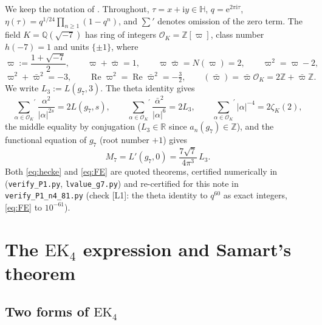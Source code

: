 \documentclass[11pt]{article}
\theoremstyle{definition}
\theoremstyle{remark}
\newcommand{\Hh}{\mathbb{H}}
\newcommand{\Qq}{\mathbb{Q}}
\newcommand{\Zz}{\mathbb{Z}}
\newcommand{\Rr}{\mathbb{R}}
\newcommand{\ii}{\mathrm{i}}
\newcommand{\e}{\mathrm{e}}
\newcommand{\ReT}{\operatorname{Re}}
\newcommand{\OO}{\mathcal{O}}
\begin{document}
We keep the notation of \cite{Zf}. Throughout,
$\tau=x+\ii y\in\Hh$, $q=\e^{2\pi \ii\tau}$,
$\eta(\tau)=q^{1/24}\prod_{n\ge1}(1-q^n)$, and $\sum'$ denotes omission
of the zero term. The field $K=\Qq(\sqrt{-7})$ has ring of integers
$\OO_K=\Zz[\varpi]$, class number $h(-7)=1$ and units $\{\pm1\}$, where
\[
  \varpi:=\frac{1+\sqrt{-7}}2,\qquad
  \varpi+\bar\varpi=1,\qquad \varpi\bar\varpi=N(\varpi)=2,\qquad \varpi^2=\varpi-2,
\]
\begin{equation}\label{eq:pirels}
  \varpi^2+\bar\varpi^2=-3,\qquad \ReT\varpi^2=\ReT\bar\varpi^2=-\tfrac32,\qquad
  (\bar\varpi)=\bar\varpi\OO_K=2\Zz+\bar\varpi\Zz .
\end{equation}
We write $L_3:=L(g_7,3)$. The theta identity
\cite[Appendix~B]{Zf} gives
\begin{equation}\label{eq:hecke}
  {\sum_{\alpha\in\OO_K}}^{\!\prime}\frac{\alpha^2}{|\alpha|^{2s}}=2L(g_7,s),
  \qquad
  {\sum_{\alpha\in\OO_K}}^{\!\prime}\frac{\bar\alpha^2}{|\alpha|^6}=2L_3,
  \qquad
  {\sum_{\alpha\in\OO_K}}^{\!\prime}|\alpha|^{-4}=2\zeta_K(2),
\end{equation}
the middle equality by conjugation ($L_3\in\Rr$ since $a_n(g_7)\in\Zz$),
and the functional equation of $g_7$ (root number $+1$) gives
\begin{equation}\label{eq:FE}
  M_7=L'(g_7,0)=\frac{7\sqrt7}{4\pi^3}\,L_3 .
\end{equation}
Both \eqref{eq:hecke} and \eqref{eq:FE} are quoted theorems, certified
numerically in \cite{Zf} (\texttt{verify\_P1.py},
\texttt{lvalue\_g7.py}) and re-certified for this note in
\texttt{verify\_P1\_n4\_81.py} (check [L1]: the theta identity to
$q^{60}$ as exact integers, \eqref{eq:FE} to $10^{-61}$).

\section{The \texorpdfstring{$\mathrm{EK}_4$}{EK4} expression and Samart's theorem}\label{sec:EK4}

\subsection{Two forms of \texorpdfstring{$\mathrm{EK}_4$}{EK4}}
\end{document}
